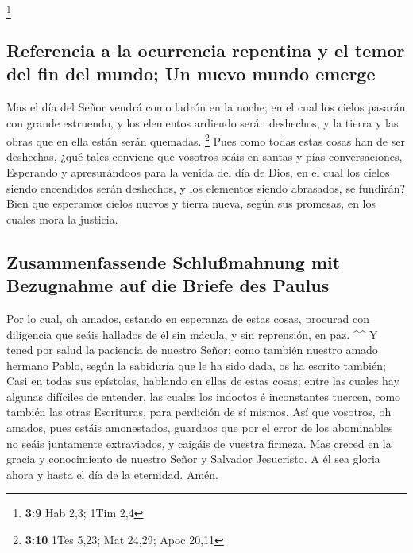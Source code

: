 \footnote{\textbf{3:9} Hab 2,3; 1Tim 2,4}

\hypertarget{referencia-a-la-ocurrencia-repentina-y-el-temor-del-fin-del-mundo-un-nuevo-mundo-emerge}{%
\subsection{Referencia a la ocurrencia repentina y el temor del fin del
mundo; Un nuevo mundo
emerge}\label{referencia-a-la-ocurrencia-repentina-y-el-temor-del-fin-del-mundo-un-nuevo-mundo-emerge}}

 Mas el día del Señor vendrá como ladrón en la noche; en el
cual los cielos pasarán con grande estruendo, y los elementos ardiendo
serán deshechos, y la tierra y las obras que en ella están serán
quemadas. \footnote{\textbf{3:10} 1Tes 5,23; Mat 24,29; Apoc 20,11}
 Pues como todas estas cosas han de ser deshechas, ¿qué
tales conviene que vosotros seáis en santas y pías conversaciones,
 Esperando y apresurándoos para la venida del día de Dios,
en el cual los cielos siendo encendidos serán deshechos, y los elementos
siendo abrasados, se fundirán?  Bien que esperamos cielos
nuevos y tierra nueva, según sus promesas, en los cuales mora la
justicia.

\hypertarget{zusammenfassende-schluuxdfmahnung-mit-bezugnahme-auf-die-briefe-des-paulus}{%
\subsection{Zusammenfassende Schlußmahnung mit Bezugnahme auf die Briefe
des
Paulus}\label{zusammenfassende-schluuxdfmahnung-mit-bezugnahme-auf-die-briefe-des-paulus}}

 Por lo cual, oh amados, estando en esperanza de estas
cosas, procurad con diligencia que seáis hallados de él sin mácula, y
sin reprensión, en paz. \^{}\^{}  Y tened por salud la
paciencia de nuestro Señor; como también nuestro amado hermano Pablo,
según la sabiduría que le ha sido dada, os ha escrito también;
 Casi en todas sus epístolas, hablando en ellas de estas
cosas; entre las cuales hay algunas difíciles de entender, las cuales
los indoctos é inconstantes tuercen, como también las otras Escrituras,
para perdición de sí mismos.  Así que vosotros, oh amados,
pues estáis amonestados, guardaos que por el error de los abominables no
seáis juntamente extraviados, y caigáis de vuestra firmeza.
 Mas creced en la gracia y conocimiento de nuestro Señor y
Salvador Jesucristo. A él sea gloria ahora y hasta el día de la
eternidad. Amén.
